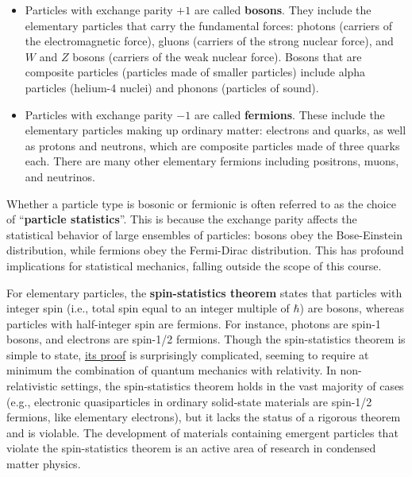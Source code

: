 \documentclass[prx,12pt]{revtex4-2}
\begin{document}
\begin{itemize}
\item Particles with exchange parity $+1$ are called \textbf{bosons}.
  They include the elementary particles that carry the fundamental
  forces: photons (carriers of the electromagnetic force), gluons
  (carriers of the strong nuclear force), and $W$ and $Z$ bosons
  (carriers of the weak nuclear force).  Bosons that are composite
  particles (particles made of smaller particles) include alpha
  particles (helium-4 nuclei) and phonons (particles of sound).

\item Particles with exchange parity $-1$ are called
  \textbf{fermions}.  These include the elementary particles making up
  ordinary matter: electrons and quarks, as well as protons and
  neutrons, which are composite particles made of three quarks each.
  There are many other elementary fermions including positrons, muons,
  and neutrinos.
\end{itemize}

Whether a particle type is bosonic or fermionic is often referred to
as the choice of ``\textbf{particle statistics}''.  This is because
the exchange parity affects the statistical behavior of large
ensembles of particles: bosons obey the Bose-Einstein distribution,
while fermions obey the Fermi-Dirac distribution.  This has profound
implications for statistical mechanics, falling outside the scope of
this course.

For elementary particles, the \textbf{spin-statistics theorem} states
that particles with integer spin (i.e., total spin equal to an integer
multiple of $\hbar$) are bosons, whereas particles with half-integer
spin are fermions.  For instance, photons are spin-1 bosons, and
electrons are spin-1/2 fermions.  Though the spin-statistics theorem
is simple to state, \hyperref[cite:duck]{its proof} is surprisingly
complicated, seeming to require at minimum the combination of quantum
mechanics with relativity.  In non-relativistic settings, the
spin-statistics theorem holds in the vast majority of cases (e.g.,
electronic quasiparticles in ordinary solid-state materials are
spin-1/2 fermions, like elementary electrons), but it lacks the status
of a rigorous theorem and is violable.  The development of materials
containing emergent particles that violate the spin-statistics theorem
is an active area of research in condensed matter physics.
\end{document}
